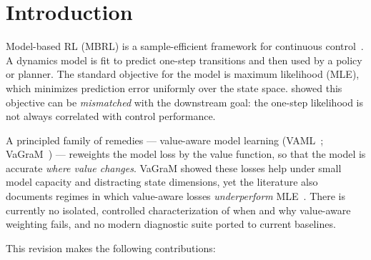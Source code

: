 \documentclass{article}
\theoremstyle{plain}
\begin{document}
\section{Introduction}

Model-based RL (MBRL) is a sample-efficient framework for continuous
control~\citep{deisenroth2011pilco,janner2019mbpo,hafner2023dreamerv3,hansen2024tdmpc2}.
A dynamics model is fit to predict one-step transitions and then used by a policy or
planner. The standard objective for the model is maximum likelihood (MLE), which
minimizes prediction error uniformly over the state space. \citet{lambert2020objective} showed this objective can be \emph{mismatched} with
the downstream goal: the one-step likelihood is not always correlated with control
performance.

A principled family of remedies --- value-aware model learning
(VAML~\citep{farahmand2017vaml,farahmand2018itervaml}; VaGraM~\citep{voelcker2022vagram})
--- reweights the model loss by the value function, so that the model is accurate
\emph{where value changes}. VaGraM showed these losses help under small model capacity
and distracting state dimensions, yet the literature also documents regimes in which
value-aware losses \emph{underperform} MLE~\citep{voelcker2022vagram,cvaml2025,romi2026}.
There is currently no isolated, controlled characterization of when and why value-aware
weighting fails, and no modern diagnostic suite ported to current baselines.

This revision makes the following contributions:
\end{document}
